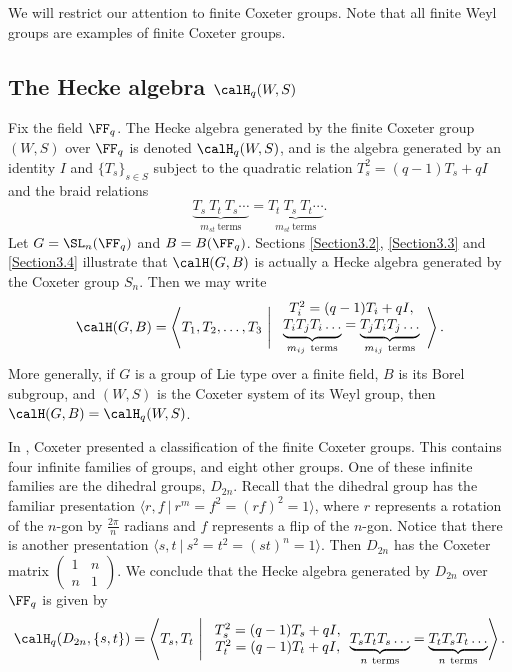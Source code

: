 \documentclass[11pt]{amsart}
\theoremstyle{remark}
\begin{document}
We will restrict our attention to finite Coxeter groups. Note that all finite Weyl groups are examples of finite Coxeter groups.


\subsection{The Hecke algebra $\calH_q(W,S)$}\label{Section3.6}
Fix the field $\FF_q$.
The Hecke algebra generated by the finite Coxeter group $(W,S)$ over $\FF_q$ is denoted $\calH_q(W,S)$, and is the algebra generated by an identity $I$ and $\{T_s\}_{s\in S}$ subject to the quadratic relation $T_s^2 = (q-1)T_s + qI$ and the braid relations
\[
	\underbrace{T_s\ T_t\ T_s \cdots}_{m_{st}\ \text{terms}} = \underbrace{T_t\ T_s\ T_t \cdots}_{m_{st}\ \text{terms}}.
\]
Let $G=\SL_n(\FF_q)$ and $B=B(\FF_q)$.
Sections \ref{Section3.2}, \ref{Section3.3} and \ref{Section3.4} illustrate that $\calH(G,B)$ is actually a Hecke algebra generated by the Coxeter group $S_n$.
Then we may write
\[
	\calH(G,B) = \left\langle T_1, T_2, \ldots, T_3\ \Bigg|\ \begin{array}{c}
		T_i^2 = (q-1)T_i + qI, \\
		\underbrace{T_iT_jT_i\ldots}_{m_{ij}\ \text{terms}} = \underbrace{T_jT_iT_j\ldots}_{m_{ij}\ \text{terms}}
	\end{array}\right\rangle.
\]
More generally, if $G$ is a group of Lie type over a finite field, $B$ is its Borel subgroup, and $(W,S)$ is the Coxeter system of its Weyl group, then $\calH(G,B) = \calH_q(W,S)$.

In \cite{Coxeter35}, Coxeter presented a classification of the finite Coxeter groups.
This contains four infinite families of groups, and eight other groups.
One of these infinite families are the dihedral groups, $D_{2n}$.
Recall that the dihedral group has the familiar presentation $\langle r,f\ |\ r^m =f^2=(rf)^2=1\rangle$, where $r$ represents a rotation of the $n$-gon by $\frac{2\pi}{n}$ radians and $f$ represents a flip of the $n$-gon.
Notice that there is another presentation $\langle s,t\ |\ s^2=t^2=(st)^n =1\rangle$.
Then $D_{2n}$ has the Coxeter matrix $\left(\begin{smallmatrix}1&n\\ n&1\end{smallmatrix}\right)$.
We conclude that the Hecke algebra generated by $D_{2n}$ over $\FF_q$ is given by
\[
	\calH_q(D_{2n},\{s,t\}) = \left\langle T_s,T_t\ \Bigg|\ \begin{array}{c}
		T_s^2 = (q-1)T_s+qI, \\
		T_t^2 = (q-1)T_t+qI,
	\end{array}
	\underbrace{T_sT_tT_s\ldots}_{n\ \text{terms}} = \underbrace{T_tT_sT_t\ldots}_{n\ \text{terms}}\right\rangle.
\]
\end{document}
